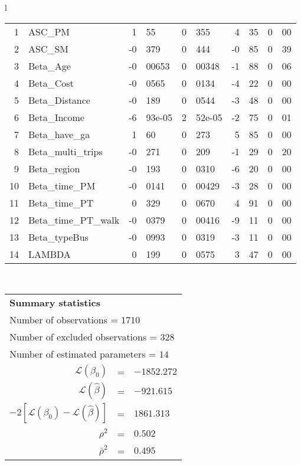 \begin{tabular}{l}
\begin{tabular}{rlr@{.}lr@{.}lr@{.}lr@{.}l}
1 & ASC_PM  & 1&55 & 0&355 & 4&35 & 0&00\\
2 & ASC_SM & -0&379 & 0&444 & -0&85 & 0&39\\
3 & Beta_Age & -0&00653 & 0&00348 & -1&88 & 0&06\\
4 & Beta_Cost & -0&0565 & 0&0134 & -4&22 & 0&00\\
5 & Beta_Distance & -0&189 & 0&0544 & -3&48 & 0&00\\
6 & Beta_Income & -6&93e-05 & 2&52e-05 & -2&75 & 0&01\\
7 & Beta_have_ga & 1&60 & 0&273 & 5&85 & 0&00\\
8 & Beta_multi_trips & -0&271 & 0&209 & -1&29 & 0&20\\
9 & Beta_region & -0&193 & 0&0310 & -6&20 & 0&00\\
10 & Beta_time_PM & -0&0141 & 0&00429 & -3&28 & 0&00\\
11 & Beta_time_PT & 0&329 & 0&0670 & 4&91 & 0&00\\
12 & Beta_time_PT_walk & -0&0379 & 0&00416 & -9&11 & 0&00\\
13 & Beta_typeBus & -0&0993 & 0&0319 & -3&11 & 0&00\\
14 & LAMBDA & 0&199 & 0&0575 & 3&47 & 0&00\\
\hline
\end{tabular}
\\
\begin{tabular}{rcl}
\multicolumn{3}{l}{\bf Summary statistics}\\
\multicolumn{3}{l}{ Number of observations = $1710$} \\
\multicolumn{3}{l}{ Number of excluded observations = $328$} \\
\multicolumn{3}{l}{ Number of estimated  parameters = $14$} \\
 $\mathcal{L}(\beta_0)$ &=&  $-1852.272$ \\
 $\mathcal{L}(\hat{\beta})$ &=& $-921.615 $  \\
 $-2[\mathcal{L}(\beta_0) -\mathcal{L}(\hat{\beta})]$ &=& $1861.313$ \\
    $\rho^2$ &=&   $0.502$ \\
    $\bar{\rho}^2$ &=&    $0.495$ \\
\end{tabular}
  \end{tabular}
